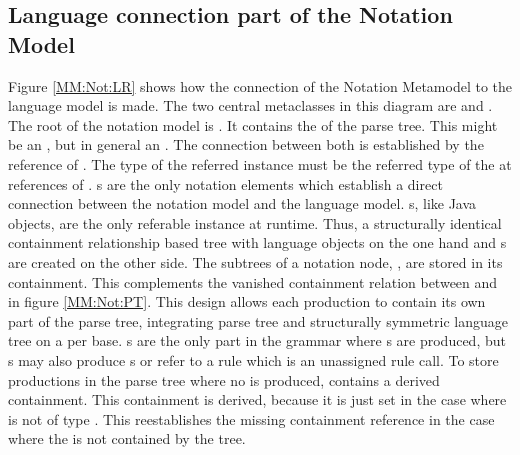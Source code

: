 \subsection{Language connection part of the Notation Model} \label{sec:MM:Not:Prod}
Figure \ref{MM:Not:LR} shows how the connection of the Notation Metamodel to the language model is made. The two central metaclasses in this diagram are  and . The root of the notation model is . It contains the  of the parse tree. This might be an , but in general an . The connection between both is established by the reference  of .  The type of the referred instance must be the referred type of the  at  references of . s are the only notation elements which establish a direct connection between the notation model and the language model. s, like Java objects, are the only referable instance at runtime. Thus, a structurally identical containment relationship based tree with language objects on the one hand and s are created on the other side. The subtrees of a notation node, , are stored in its  containment. This complements the vanished containment relation between  and  in figure \ref{MM:Not:PT}. This design allows each  production to contain its own part of the parse tree, integrating parse tree and structurally symmetric language tree on a per  base. s are the only part in the grammar where s are produced, but s may also produce s or refer to a rule which is an unassigned rule call. To store productions in the parse tree where no  is produced,  contains a derived  containment. This containment is derived, because it is just set in the case where  is not of type . This reestablishes the missing containment reference in the case where the  is not contained by the  tree. \\
